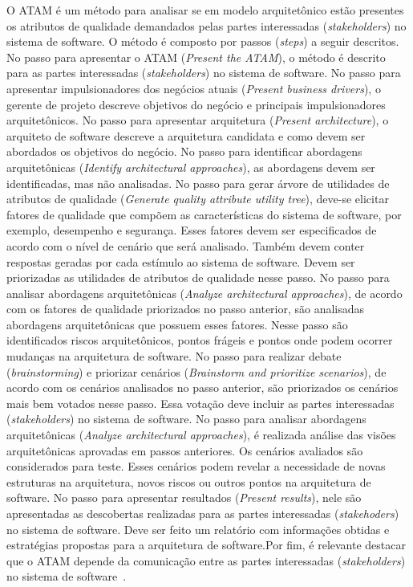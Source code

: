 O ATAM é um método para analisar se em modelo arquitetônico estão presentes os atributos de qualidade demandados pelas partes interessadas (\emph{stakeholders}) no sistema de software. O método é composto por passos (\emph{steps}) a seguir descritos. No passo para apresentar o ATAM (\emph{Present the ATAM}), o método é descrito para as partes interessadas (\emph{stakeholders}) no sistema de software. No passo para apresentar impulsionadores dos negócios atuais (\emph{Present business drivers}), o gerente de projeto descreve objetivos do negócio e principais impulsionadores arquitetônicos. No passo para apresentar arquitetura (\emph{Present architecture}), o arquiteto de software descreve a arquitetura candidata e como devem ser abordados os objetivos do negócio. No passo para identificar abordagens arquitetônicas (\emph{Identify architectural approaches}), as abordagens devem ser identificadas, mas não analisadas. No passo para gerar árvore de utilidades de atributos de qualidade (\emph{Generate quality attribute utility tree}), deve-se elicitar fatores de qualidade que compõem as características do sistema de software, por exemplo, desempenho e segurança. Esses fatores devem ser especificados de acordo com o nível de cenário que será analisado. Também devem conter respostas geradas por cada estímulo ao sistema de software. Devem ser priorizadas as utilidades de atributos de qualidade nesse passo. No passo para analisar abordagens arquitetônicas (\emph{Analyze architectural approaches}), de acordo com os fatores de qualidade priorizados no passo anterior, são analisadas abordagens arquitetônicas que possuem esses fatores. Nesse passo são identificados riscos arquitetônicos, pontos frágeis e pontos onde podem ocorrer mudanças na arquitetura de software. No passo para realizar debate (\emph{brainstorming}) e priorizar cenários (\emph{Brainstorm and prioritize scenarios}), de acordo com os cenários analisados no passo anterior, são priorizados os cenários mais bem votados nesse passo. Essa votação deve incluir as partes interessadas (\emph{stakeholders}) no sistema de software. No passo para analisar abordagens arquitetônicas (\emph{Analyze architectural approaches}), é realizada análise das visões arquitetônicas aprovadas em passos anteriores. Os cenários avaliados são considerados para teste. Esses cenários podem revelar a necessidade de novas estruturas na arquitetura, novos riscos ou outros pontos na arquitetura de software. No passo para apresentar resultados (\emph{Present results}), nele são apresentadas as descobertas realizadas para as partes interessadas (\emph{stakehoders}) no sistema de software. Deve ser feito um relatório com informações obtidas e estratégias propostas para a arquitetura de software.Por fim, é relevante destacar que o ATAM depende da comunicação entre as partes interessadas (\emph{stakeholders}) no sistema de software~\cite{ATAM}.

